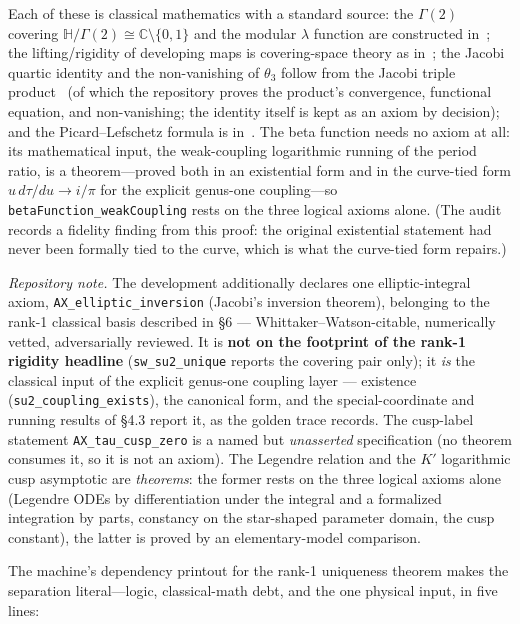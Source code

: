 \documentclass{article}
\theoremstyle{plain}
\theoremstyle{definition}
\numberwithin{equation}{section}
\newcommand{\C}{\mathbb{C}}
\newcommand{\HH}{\mathbb{H}}
\newcommand{\code}[1]{\texttt{#1}}
\begin{document}
\noindent Each of these is classical mathematics with a standard source: the $\Gamma(2)$ covering
$\HH/\Gamma(2)\cong\C\setminus\{0,1\}$ and the modular $\lambda$ function are constructed
in~\cite{Ahlfors1979}; the lifting/rigidity of developing maps is covering-space theory as
in~\cite{Forster1981}; the Jacobi quartic identity and the non-vanishing of $\theta_3$ follow from
the Jacobi triple product~\cite{WhittakerWatson1927} (of which the repository proves the
product's convergence, functional equation, and non-vanishing; the identity itself is kept as an
axiom by decision); and the Picard--Lefschetz formula is
in~\cite{AGZV1988}. The beta function needs no axiom at all: its mathematical input, the
weak-coupling logarithmic running of the period ratio, is a theorem---proved both in an
existential form and in the curve-tied form $u\,d\tau/du \to i/\pi$ for the explicit genus-one
coupling---so \code{betaFunction\_weakCoupling} rests on the three logical axioms alone. (The
audit records a fidelity finding from this proof: the original existential statement had never
been formally tied to the curve, which is what the curve-tied form repairs.)

\medskip
\noindent\emph{Repository note.} The development additionally declares one
elliptic-integral axiom, \code{AX\_\allowbreak elliptic\_\allowbreak inversion}
(Jacobi's inversion theorem), belonging to the rank-1 classical basis described in
\S6 --- Whittaker--Watson-citable, numerically vetted, adversarially reviewed. It is
\textbf{not on the footprint of the rank-1 rigidity headline} (\code{sw\_su2\_unique}
reports the covering pair only); it \emph{is} the classical input of the explicit
genus-one coupling layer --- existence (\code{su2\_coupling\_exists}), the canonical
form, and the special-coordinate and running results of \S4.3 report it, as the golden
trace records. The cusp-label
statement \code{AX\_tau\_\allowbreak cusp\_zero} is a named but \emph{unasserted}
specification (no theorem consumes it, so it is not an axiom). The Legendre relation
and the $K'$ logarithmic cusp asymptotic are \emph{theorems}: the former rests on
the three logical axioms alone (Legendre ODEs by differentiation under the integral
and a formalized integration by parts, constancy on the star-shaped parameter
domain, the cusp constant), the latter is proved by an elementary-model comparison.

\medskip
\noindent The machine's dependency printout for the rank-1 uniqueness theorem makes the separation
literal---logic, classical-math debt, and the one physical input, in five lines:
\end{document}
